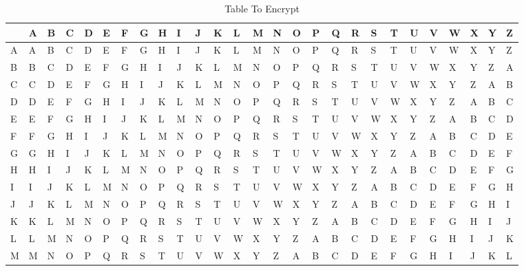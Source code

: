 \documentclass{article}
\begin{document}
\begin{table}[ht]
\centering
\caption{Table To Encrypt}
\begin{adjustbox}{width=1\textwidth}
\small
\begin{tabular}{|l|llllllllllllllllllllllllll|} 
\hline
  & A & B & C & D                      & E & F & G & H & I & J & K & L & M & N & O & P & Q & R & S & T & U & V & W & X & Y & Z  \\ 
\hline
A & A & B & C & D                      & E & F & G & H & I & J & K & L & M & N & O & P & Q & R & S & T & U & V & W & X & Y & Z  \\
B & B & C & D & E                      & F & G & H & I & J & K & L & M & N & O & P & Q & R & S & T & U & V & W & X & Y & Z & A  \\
C & C & D & E & F                      & G & H & I & J & K & L & M & N & O & P & Q & R & S & T & U & V & W & X & Y & Z & A & B  \\
D & D & E & F & G                      & H & I & J & K & L & M & N & O & P & Q & R & S & T & U & V & W & X & Y & Z & A & B & C  \\
E & E & F & G & H                      & I & J & K & L & M & N & O & P & Q & R & S & T & U & V & W & X & Y & Z & A & B & C & D  \\
F & F & G & H & \multicolumn{1}{l|}{I} & J & K & L & M & N & O & P & Q & R & S & T & U & V & W & X & Y & Z & A & B & C & D & E  \\
G & G & H & I & J                      & K & L & M & N & O & P & Q & R & S & T & U & V & W & X & Y & Z & A & B & C & D & E & F  \\
H & H & I & J & K                      & L & M & N & O & P & Q & R & S & T & U & V & W & X & Y & Z & A & B & C & D & E & F & G  \\
I & I & J & K & L                      & M & N & O & P & Q & R & S & T & U & V & W & X & Y & Z & A & B & C & D & E & F & G & H  \\
J & J & K & L & M                      & N & O & P & Q & R & S & T & U & V & W & X & Y & Z & A & B & C & D & E & F & G & H & I  \\
K & K & L & M & N                      & O & P & Q & R & S & T & U & V & W & X & Y & Z & A & B & C & D & E & F & G & H & I & J  \\
L & L & M & N & O                      & P & Q & R & S & T & U & V & W & X & Y & Z & A & B & C & D & E & F & G & H & I & J & K  \\
M & M & N & O & P                      & Q & R & S & T & U & V & W & X & Y & Z & A & B & C & D & E & F & G & H & I & J & K & L  \\

\end{tabular}
\end{adjustbox}
\end{table}
\end{document}
